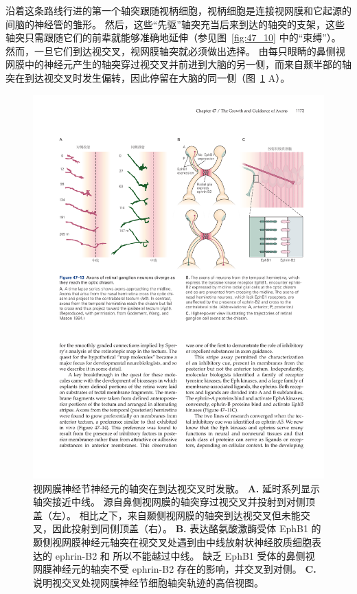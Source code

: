 沿着这条路线行进的第一个轴突跟随视柄细胞，视柄细胞是连接视网膜和它起源的间脑的神经管的雏形。
然后，这些“先驱”轴突充当后来到达的轴突的支架，这些轴突只需跟随它们的前辈就能够准确地延伸（参见图~\ref{fig:47_10} 中的“束缚”）。
然而，一旦它们到达视交叉，视网膜轴突就必须做出选择。
由每只眼睛的鼻侧视网膜中的神经元产生的轴突穿过视交叉并前进到大脑的另一侧，而来自颞半部的轴突在到达视交叉时发生偏转，因此停留在大脑的同一侧（图~\ref{fig:47_13} A）。


\begin{figure}[htbp]
	\centering
	\includegraphics[width=1.0\linewidth]{chap47/fig_47_13}
	\caption{视网膜神经节神经元的轴突在到达视交叉时发散。
		\textbf{A.} 延时系列显示轴突接近中线。
		源自鼻侧视网膜的轴突穿过视交叉并投射到对侧顶盖（左）。
		相比之下，来自颞侧视网膜的轴突到达视交叉但未能交叉，因此投射到同侧顶盖（右）。
		\textbf{B.} 表达酪氨酸激酶受体 EphB1 的颞侧视网膜神经元轴突在视交叉处遇到由中线放射状神经胶质细胞表达的 ephrin-B2 和 所以不能越过中线。
		缺乏 EphB1 受体的鼻侧视网膜神经元的轴突不受 ephrin-B2 存在的影响，并交叉到对侧。
		\textbf{C.} 说明视交叉处视网膜神经节细胞轴突轨迹的高倍视图。}
	\label{fig:47_13}
\end{figure}


